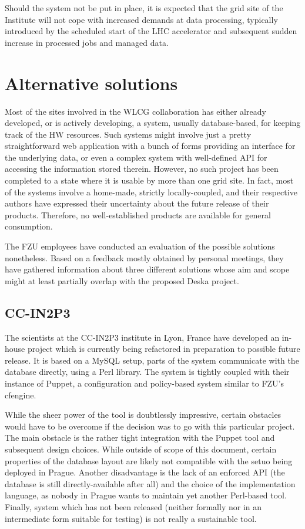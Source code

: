 \documentclass[12pt]{article}
\begin{document}
Should the system not be put in place, it is expected that the grid site of the Institute will not cope with increased demands at
data processing, typically introduced by the scheduled start of the LHC accelerator and subsequent sudden increase in processed
jobs and managed data.

\section{Alternative solutions}
Most of the sites involved in the WLCG collaboration has either already developed, or is actively developing, a system, usually
database-based, for keeping track of the HW resources.  Such systems might involve just a pretty straightforward web application
with a bunch of forms providing an interface for the underlying data, or even a complex system with well-defined API for accessing
the information stored therein.  However, no such project has been completed to a state where it is usable by more than one grid
site.  In fact, most of the systems involve a home-made, strictly locally-coupled, and their respective authors have expressed
their uncertainty about the future release of their products.  Therefore, no well-established products are available for general
consumption.

The FZU employees have conducted an evaluation of the possible solutions nonetheless.  Based on a feedback mostly obtained by
personal meetings, they have gathered information about three different solutions whose aim and scope might at least partially
overlap with the proposed Deska project.

\subsection{CC-IN2P3}
The scientists at the CC-IN2P3 institute in Lyon, France have developed an in-house project which is currently being refactored in
preparation to possible future release.  It is based on a MySQL setup, parts of the system communicate with the database directly,
using a Perl library.  The system is tightly coupled with their instance of Puppet, a configuration and policy-based system
similar to FZU's cfengine.

While the sheer power of the tool is doubtlessly impressive, certain obstacles would have to be overcome if the decision was to go
with this particular project.  The main obstacle is the rather tight integration with the Puppet tool and subsequent design
choices.  While outside of scope of this document, certain properties of the database layout are likely not compatible with the
setuo being deployed in Prague.  Another disadvantage is the lack of an enforced API (the database is still directly-available
after all) and the choice of the implementation language, as nobody in Prague wants to maintain yet another Perl-based tool.
Finally, system which has not been released (neither formally nor in an intermediate form suitable for testing) is not really a
sustainable tool.
\end{document}
